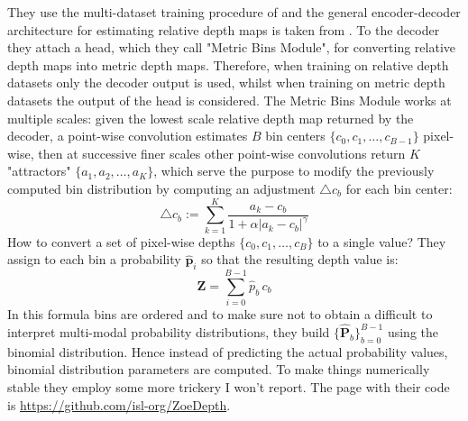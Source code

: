 They use the multi-dataset training procedure of \cite{MiDas} and the general encoder-decoder architecture for estimating relative depth maps is taken from \cite{denseViT}.
To the decoder they attach a head, which they call "Metric Bins Module", for converting relative depth maps into metric depth maps.
Therefore, when training on relative depth datasets only the decoder output is used, whilst when training on metric depth datasets the output of the head is considered.
The Metric Bins Module works at multiple scales: given the lowest scale relative depth map returned by the decoder, a point-wise convolution estimates $B$ bin centers $\{c_{0}, c_{1}, \dotsc, c_{B-1}\}$ pixel-wise, then at successive finer scales other point-wise convolutions return $K$ "attractors" $\{a_{1}, a_{2}, \dotsc, a_{K}\}$, which serve the purpose to modify the previously computed bin distribution by computing an adjustment $\triangle c_{b}$ for each bin center:
\[
	\triangle c_{b} := \sum_{k=1}^{K} \frac{a_{k} - c_{b}}{1 + \alpha | a_{k} - c_{b} |^{\gamma}}
\]
How to convert a set of pixel-wise depths $\{c_{0}, c_{1}, \dotsc, c_{B}\}$ to a single value?
They assign to each bin a probability $\hat{\mathbf{p}}_{i}$ so that the resulting depth value is:
\[
	\mathbf{Z} = \sum_{i=0}^{B-1} \hat{p}_{b} \, c_{b}
\]
In this formula bins are ordered and to make sure not to obtain a difficult to interpret multi-modal probability distributions, they build $\{\hat{\mathbf{P}}_{b}\}_{b=0}^{B-1}$ using the binomial distribution. Hence instead of predicting the actual probability values, binomial distribution parameters are computed.
To make things numerically stable they employ some more trickery I won't report.
The page with their code is \url{https://github.com/isl-org/ZoeDepth}.